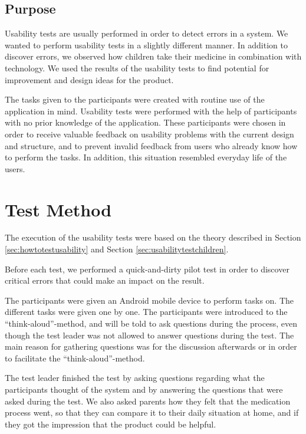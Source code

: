 
\subsection{Purpose}
\label{sec:usabilitypurpose}
Usability tests are usually performed in order to detect errors in a system. We wanted to perform usability tests in a slightly different manner. In addition to discover errors, we observed how children take their medicine in combination with technology. We used the results of the usability tests to find potential for improvement and design ideas for  the product.
 
The tasks given to the participants were created with routine use of the application in mind. Usability tests were performed with the help of participants with no prior knowledge of the application. These participants were chosen in order to receive valuable feedback on usability problems with the current design and structure, and to prevent invalid feedback from users who already know how to perform the tasks. In addition, this situation resembled everyday life of the users.



\section{Test Method}
The execution of the usability tests were based on the theory described in Section \ref{sec:howtotestusability} and Section \ref{sec:usabilitytestchildren}.

Before each test, we performed a quick-and-dirty pilot test in order to discover critical errors that could make an impact on the result.

The participants were given an Android mobile device to perform tasks on. The different tasks were given one by one. The participants were introduced to the ``think-aloud''-method, and will be told to ask questions during the process, even though the test leader was not allowed to answer questions during the test. The main reason for gathering questions was for the discussion afterwards or in order to facilitate the ``think-aloud''-method. 

The test leader finished the test by asking questions regarding what the participants thought of the system and by answering the questions that were asked during the test. We also asked parents how they felt that the medication process went, so that they can compare it to their daily situation at home, and if they got the impression that the product could be helpful.  

